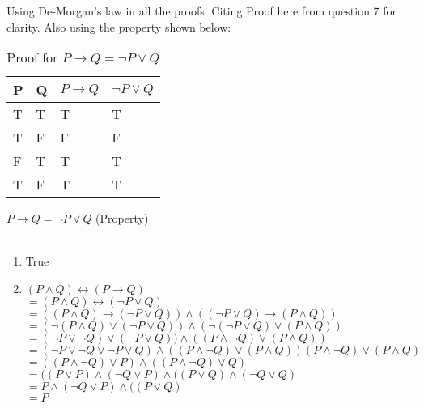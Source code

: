 \documentclass[10.5pt]{article}
\newenvironment{solution}[2][Solution]{ \begin{trivlist}
\item[\hskip \labelsep {\bfseries #1}]}{\end{trivlist}}
\begin{document}
\begin{solution}{6}
\item[]
Using De-Morgan's law in all the proofs. Citing Proof here from question 7 for clarity. Also using the property shown below:
\begin{table}[!h]
\centering
\caption{Proof for $P \rightarrow Q = \lnot P \vee Q$}
\label{my-label}
\begin{tabular}{|l|l|l|l|}
\hline
P & Q & $P \rightarrow Q$ & $\lnot P \vee Q$ \\ \hline
T & T & T                 & T                \\ \hline
T & F & F                 & F                \\ \hline
F & T & T                 & T                \\ \hline
T & F & T                 & T                \\ \hline
\end{tabular}
\end{table}

$P \rightarrow Q = \lnot P \vee Q $ (Property) \\ \\
\begin{enumerate}
  \parskip=0in
  \parsep=0in
  \itemsep=0in
\item True
\item
$(P \wedge Q) \leftrightarrow (P \rightarrow Q)$\\
$= (P \wedge Q)\leftrightarrow(\neg P \vee Q)$\\
$= ((P \wedge Q)\rightarrow(\neg P \vee Q))\wedge((\neg P \vee Q)\rightarrow(P \wedge Q))$\\
$= (\neg (P \wedge Q)\vee(\neg P \vee Q))\wedge(\neg(\neg P \vee Q)\vee (P \wedge Q))$\\
$= (\neg P \vee  \neg Q)\vee (\neg P \vee Q))\wedge((P \wedge \neg Q)\vee (P \wedge Q))$\\
$= (\neg P \vee \neg Q \vee \neg P \vee Q)\wedge((P \wedge \neg Q)\vee (P \wedge Q)) (P \wedge \neg Q)\vee(P \wedge Q)$\\
$= ((P \wedge \neg Q)\vee P)\wedge((P \wedge \neg Q)\vee Q)$\\
$= ((P \vee P)\wedge(\neg Q \vee P)\wedge((P \vee Q)\wedge(\neg Q\vee Q)$\\
$= P \wedge(\neg Q\vee P)\wedge((P \vee Q)$\\
$= P$


\end{enumerate}
\end{solution}
\end{document}
